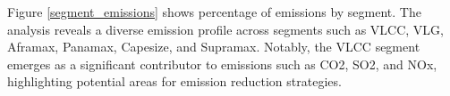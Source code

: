 Figure \ref{segment_emissions} shows percentage of emissions by segment.
The analysis reveals a diverse emission profile across segments such as VLCC, VLG, Aframax, Panamax, Capesize, and Supramax. 
Notably, the VLCC segment emerges as a significant contributor to emissions such as CO2, SO2, and NOx, highlighting potential areas for emission reduction strategies.